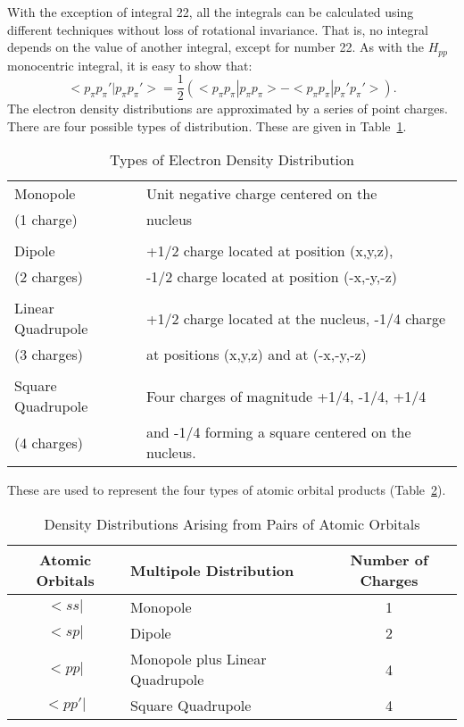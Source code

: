  With the exception of integral 22, all the integrals can
be calculated using different techniques without loss of
rotational invariance. That is, no integral depends on the
value of another integral, except for number 22. As with
the $H_{pp}$ monocentric integral, it is easy to show that:
$$
 <p_{\pi} p_{\pi} '|p_{\pi} p_{\pi} '> = \frac{1}{2}(<p_{\pi} p_{\pi} |p_{\pi} p_{\pi} >
- <p_{\pi} p_{\pi} |p_{\pi} 'p_{\pi} '>).
$$
 The electron density distributions are approximated by a
series of point charges. There are four possible types of
distribution. These are given in Table~\ref{mp}.

\begin{table}
\caption{\label{mp}Types of Electron Density Distribution}
\begin{center}
\begin{tabular}{ll}\hline
 Monopole & Unit negative charge centered on the  \\
 (1 charge)&  nucleus  \\
\\
 Dipole & +1/2 charge located at position (x,y,z),  \\
 (2 charges) & -1/2 charge located at position (-x,-y,-z)  \\
\\
 Linear Quadrupole& +1/2 charge located at the nucleus, -1/4 charge  \\
 (3 charges) & at positions (x,y,z) and at (-x,-y,-z)  \\
\\
 Square Quadrupole& Four charges of magnitude +1/4, -1/4, +1/4  \\
 (4 charges) & and -1/4 forming a square centered on the  nucleus.  \\ \hline
\end{tabular}
\end{center}
\end{table}

These are used to represent the four types of atomic orbital
products (Table~\ref{prod}).

\begin{table}
\caption{\label{prod}Density Distributions Arising from Pairs of Atomic Orbitals}
\begin{center}
\begin{tabular}{clc}\hline
Atomic Orbitals &  Multipole Distribution & Number of Charges \rule[-0.2cm]{0cm}{0.6cm} \\ \hline
$ <ss| $  &  Monopole                      &  1  \\
$ <sp| $  &  Dipole                        &  2  \\
$ <pp| $  &  Monopole plus Linear Quadrupole &4  \\
$ <pp'|$  &  Square Quadrupole             &  4  \\ \hline
\end{tabular}
\end{center}
\end{table}

